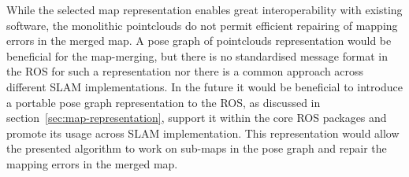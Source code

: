 While the selected map representation enables great interoperability with existing software, the monolithic pointclouds do not permit efficient repairing of mapping errors in the merged map. A pose graph of pointclouds representation would be beneficial for the map-merging, but there is no standardised message format in the \gls{ROS} for such a representation nor there is a common approach across different \gls{SLAM} implementations. In the future it would be beneficial to introduce a portable pose graph representation to the \gls{ROS}, as discussed in section~\ref{sec:map-representation}, support it within the core \gls{ROS} packages and promote its usage across \gls{SLAM} implementation. This representation would allow the presented algorithm to work on sub-maps in the pose graph and repair the mapping errors in the merged map.
